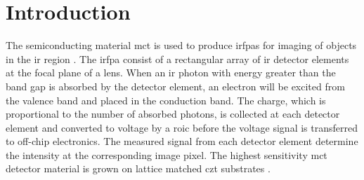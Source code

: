 \chapter{Introduction}




The semiconducting material \ac{mct} is used to produce \acp{irfpa} for imaging of objects in the \ac{ir} region \citep{dhar2013advances}. The \ac{irfpa} consist of a rectangular array of \ac{ir} detector elements at the focal plane of a lens. When an \ac{ir} photon with energy greater than the band gap is absorbed by the detector element, an electron will be excited from the valence band and placed in the conduction band. The charge, which is proportional to the number of absorbed photons, is collected at each detector element and converted to voltage by a \ac{roic} before the voltage signal is transferred to off-chip electronics. The measured signal from each detector element determine the intensity at the corresponding image pixel. The highest sensitivity \ac{mct} detector material is grown on lattice matched \ac{czt} substrates \citep{benson2016analysis}.

